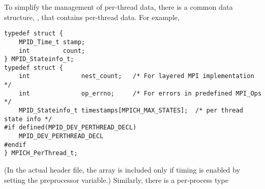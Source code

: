 \documentclass{article}
\begin{document}
To simplify the management of per-thread data, there is a common data
structure, , that contains per-thread data.
For example,
% 
\begin{verbatim}
typedef struct {
    MPID_Time_t stamp;
    int         count;
} MPID_Stateinfo_t;
typedef struct {
    int              nest_count;   /* For layered MPI implementation */
    int              op_errno;     /* For errors in predefined MPI_Ops */
    MPID_Stateinfo_t timestamps[MPICH_MAX_STATES];  /* per thread state info */
#if defined(MPID_DEV_PERTHREAD_DECL)
    MPID_DEV_PERTHREAD_DECL
#endif    
} MPICH_PerThread_t;
\end{verbatim}
(In the actual  header file, the 
array is included only if timing is enabled by setting the
 preprocessor variable.)
Similarly, there is a per-process type
\end{document}
